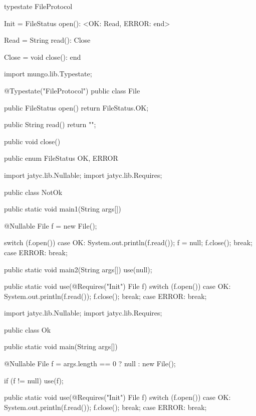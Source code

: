 \begin{code}
typestate FileProtocol {

  Init = {
    FileStatus open(): <OK: Read, ERROR: end>
  }

  Read = {
    String read(): Close
  }

  Close = {
    void close(): end
  }

}\end{code}

\begin{code}
import mungo.lib.Typestate;

@Typestate("FileProtocol")
public class File {

  public FileStatus open() {
    return FileStatus.OK;
  }

  public String read() {
    return "";
  }

  public void close() {

  }

}\end{code}

\begin{code}
public enum FileStatus {
  OK, ERROR
}\end{code}

\begin{code}
import jatyc.lib.Nullable;
import jatyc.lib.Requires;

public class NotOk {
  public static void main1(String args[]) {
    @Nullable File f = new File();

    switch (f.open()) {
      case OK:
        System.out.println(f.read());
        f = null;
        f.close();
        break;
      case ERROR:
        break;
    }
  }

  public static void main2(String args[]) {
    use(null);
  }

  public static void use(@Requires("Init") File f) {
    switch (f.open()) {
      case OK:
        System.out.println(f.read());
        f.close();
        break;
      case ERROR:
        break;
    }
  }
}\end{code}

\begin{code}
import jatyc.lib.Nullable;
import jatyc.lib.Requires;

public class Ok {
  public static void main(String args[]) {
    @Nullable File f = args.length == 0 ? null : new File();

    if (f != null) {
      use(f);
    }
  }

  public static void use(@Requires("Init") File f) {
    switch (f.open()) {
      case OK:
        System.out.println(f.read());
        f.close();
        break;
      case ERROR:
        break;
    }
  }
}\end{code}

